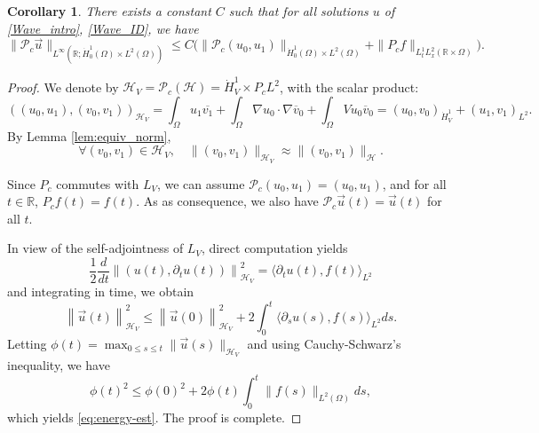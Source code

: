 \documentclass[10pt,leqno]{amsart}
\newtheorem{corollary}[theorem]{Corollary}
\theoremstyle{definition}%
\theoremstyle{remark}
\numberwithin{equation}{section}
\newcommand{\R}{\mathbb{R}}
\renewcommand{\^}{\widehat}%
\newcommand{\HHH}{\mathcal{H}}
\newcommand{\PPP}{\mathcal{P}}
\begin{document}
\begin{corollary}
	\label{cor:energy-G}
	There exists a constant $C$ such that for all solutions $u$ of \eqref{Wave_intro}, \eqref{Wave_ID}, we have
	\begin{equation}
	\label{eq:energy-est}
	\lVert\PPP_c\vec{u}\rVert_{L^\infty(\R;  \dot{ H}^1_0(\Omega)\times L^2(\Omega))}\le C\bigl( \|\PPP_c(u_0,u_1)\|_{ \dot{ H}^1_0(\Omega)\times L^2(\Omega)}
	+\| P_c f\|_{L^1_tL^2_x(\R\times \Omega)}\bigr).
	\end{equation}
\end{corollary}
\begin{proof}
	We denote by $\HHH_V=\PPP_c(\HHH)=\dot{H}^1_V\times P_cL^2$, with the scalar product:
	\begin{equation*}
	\left((u_0,u_1),(v_0,v_1)\right)_{\HHH_V}=\int _{\Omega}u_1\overline{v_1}+\int_{\Omega} \nabla u_0\cdot \nabla \overline{v}_0+\int_{\Omega} V u_0\overline{v}_0=(u_0,v_0)_{\dot{H}^1_V}+(u_1,v_1)_{L^2}.
	\end{equation*} 
	By Lemma \ref{lem:equiv_norm},
	\begin{equation}
	\label{eq:2}
	\forall (v_0,v_1)\in \HHH_V,\quad \|(v_0,v_1)\|_{\HHH_V}\approx \|(v_0,v_1)\|_{\HHH}.
	\end{equation} 
	
	Since  $P_c$ commutes with $L_V$, we can assume $\PPP_c(u_0,u_1)=(u_0,u_1)$, and for all $t\in \R$, $P_cf(t)=f(t)$. As as consequence, we also have $\PPP_c\vec{u}(t)=\vec{u}(t)$ for all $t$.
	
	In view of the self-adjointness of $L_V$, direct computation yields
	\begin{equation*}
	\frac{1}{2}\frac{d}{dt}\left\|(u(t),\partial_tu(t))\right\|^2_{\HHH_V}
	=\langle \partial_{t} u(t), f(t)\rangle_{L^2}
	\end{equation*}
	and integrating in time, we obtain
	\begin{equation*}
	\left\|\vec{u}(t)\right\|^2_{\HHH_V}\leq
	\left\|\vec{u}(0)\right\|^2_{\HHH_V}
	+2\int_0^t\langle \partial_{s} u(s), f(s)\rangle_{L^2}ds.
	\end{equation*}
	Letting $\displaystyle\phi(t)=\max_{0\leqslant s\leqslant t}\|\vec{u}(s)\|_{\HHH_V}$ and using  Cauchy-Schwarz's inequality, we have
	\begin{equation}
	\label{eq:energyest}
	\phi(t)^2\le \phi(0)^2+2\phi(t)\int_{0}^{t}\lVert f(s)\rVert_{L^2(\Omega)}ds,
	\end{equation}
	which yields \eqref{eq:energy-est}.
	The proof is complete.
\end{proof}
\end{document}

